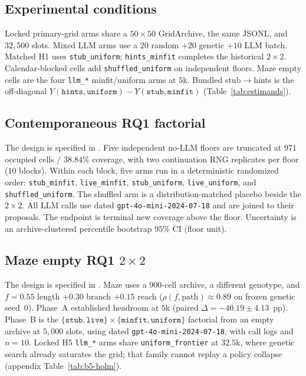 \documentclass[preprint,12pt]{elsarticle}
\begin{document}
\subsection{Experimental conditions}

Locked primary-grid arms share a $50\times50$ GridArchive, the same JSONL, and $32{,}500$ slots. Mixed LLM arms use a $20$ random ${+}20$ genetic ${+}10$ LLM batch. Matched H1 uses \texttt{stub\_uniform}; \texttt{hints\_minfit} completes the historical $2\times2$. Calendar-blocked cells add \texttt{shuffled\_uniform} on independent floors. Maze empty cells are the four \texttt{llm\_*} minfit/uniform arms at $5$k. Bundled stub$\rightarrow$hints is the off-diagonal $Y(\texttt{hints},\texttt{uniform})-Y(\texttt{stub},\texttt{minfit})$ (Table~\ref{tab:estimands}).

\subsection{Contemporaneous RQ1 factorial}
\label{sec:rq1-cf-design}

The design is specified in . Five independent no-LLM floors are truncated at $971$ occupied cells / $38.84\%$ coverage, with two continuation RNG replicates per floor ($10$ blocks). Within each block, five arms run in a deterministic randomized order: \texttt{stub\_minfit}, \texttt{live\_minfit}, \texttt{stub\_uniform}, \texttt{live\_uniform}, and \texttt{shuffled\_uniform}. The shuffled arm is a distribution-matched placebo beside the $2\times2$. All LLM calls use dated \texttt{gpt-4o-mini-2024-07-18} and are joined to their proposals. The endpoint is terminal new coverage above the floor. Uncertainty is an archive-clustered percentile bootstrap $95\%$ CI (floor unit).

\subsection{Maze empty RQ1 $2\times2$}
\label{sec:rq1-maze-design}

The design is specified in . Maze uses a $900$-cell archive, a different genotype, and $f{=}0.55$ length $+0.30$ branch $+0.15$ reach ($\rho(f,\mathrm{path}){\approx}0.89$ on frozen genetic seed~0). Phase~A established headroom at $5$k (paired $\Delta{=}{-}40.19\pm4.13$~pp). Phase~B is the $\{\texttt{stub},\texttt{live}\}\times\{\texttt{minfit},\texttt{uniform}\}$ factorial from an empty archive at $5{,}000$ slots, using dated \texttt{gpt-4o-mini-2024-07-18}, with call logs and $n{=}10$. Locked H5 \texttt{llm\_*} arms share \texttt{uniform\_frontier} at $32.5$k, where genetic search already saturates the grid; that family cannot replay a policy collapse (appendix Table~\ref{tab:b5-holm}).
\end{document}
